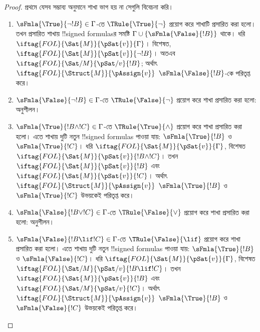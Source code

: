 \documentclass[../../../include/open-logic-section]{subfiles}
\begin{document}
\begin{proof}
প্রথমে যেসব সম্ভাব্য অনুমানে শাখা ভাগ হয় না সেগুলি বিবেচনা করি।
\begin{enumerate}
\item $\sFmla{\True}{\lnot !B} \in \Gamma$-তে
  $\TRule{\True}{\lnot}$ প্রয়োগ করে শাখাটি প্রসারিত করা হলো। তখন
  প্রসারিত শাখায় !!{signed formula}sর সমষ্টি
  $\Gamma \cup \{\sFmla{\False}{!B}\}$ থাকে। ধরি
  $\iftag{FOL}{\Sat{M}}{\pSat{v}}{\Gamma}$। বিশেষত,
  $\iftag{FOL}{\Sat{M}}{\pSat{v}}{\lnot !B}$। অতএব
  $\iftag{FOL}{\Sat/{M}}{\pSat/{v}}{!B}$; অর্থাৎ
  $\iftag{FOL}{\Struct{M}}{\pAssign{v}}$
  $\sFmla{\False}{!B}$-কে পরিতৃপ্ত করে।
\item $\sFmla{\False}{\lnot !B} \in \Gamma$-তে
  $\TRule{\False}{\lnot}$ প্রয়োগ করে শাখা প্রসারিত করা হলো: অনুশীলন।
\item $\sFmla{\True}{!B \land !C} \in \Gamma$-তে
  $\TRule{\True}{\land}$ প্রয়োগ করে শাখা প্রসারিত করা হলো। এতে
  শাখায় দুটি নতুন !!{signed formula}s পাওয়া যায়:
  $\sFmla{\True}{!B}$ ও $\sFmla{\True}{!C}$। ধরি
  $\iftag{FOL}{\Sat{M}}{\pSat{v}}{\Gamma}$, বিশেষত
  $\iftag{FOL}{\Sat{M}}{\pSat{v}}{!B \land !C}$। তখন
  $\iftag{FOL}{\Sat{M}}{\pSat{v}}{!B}$ এবং
  $\iftag{FOL}{\Sat{M}}{\pSat{v}}{!C}$। অর্থাৎ
  $\iftag{FOL}{\Struct{M}}{\pAssign{v}}$
  $\sFmla{\True}{!B}$ ও $\sFmla{\True}{!C}$ উভয়কেই পরিতৃপ্ত করে।
\item $\sFmla{\False}{!B \lor !C} \in \Gamma$-তে
  $\TRule{\False}{\lor}$ প্রয়োগ করে শাখা প্রসারিত করা হলো: অনুশীলন।
\item $\sFmla{\False}{!B \lif !C} \in \Gamma$-তে
  $\TRule{\False}{\lif}$ প্রয়োগ করে শাখা প্রসারিত করা হলো। এতে
  শাখায় দুটি নতুন !!{signed formula}s পাওয়া যায়:
  $\sFmla{\True}{!B}$ ও $\sFmla{\False}{!C}$। ধরি
  $\iftag{FOL}{\Sat{M}}{\pSat{v}}{\Gamma}$, বিশেষত
  $\iftag{FOL}{\Sat/{M}}{\pSat/{v}}{!B \lif !C}$। তখন
  $\iftag{FOL}{\Sat{M}}{\pSat{v}}{!B}$ এবং
  $\iftag{FOL}{\Sat/{M}}{\pSat/{v}}{!C}$। অর্থাৎ
  $\iftag{FOL}{\Struct{M}}{\pAssign{v}}$
  $\sFmla{\True}{!B}$ ও $\sFmla{\False}{!C}$ উভয়কেই পরিতৃপ্ত করে।

\end{enumerate}
\end{proof}
\end{document}
